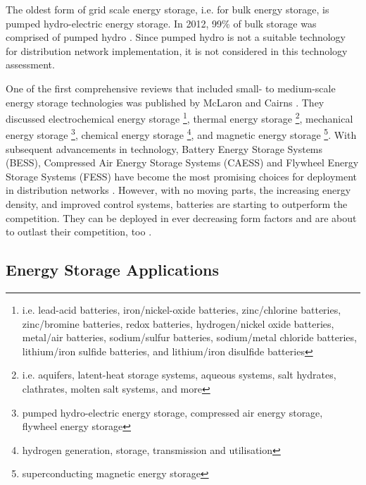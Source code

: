 The oldest form of grid scale energy storage, i.e. for bulk energy storage, is pumped hydro-electric energy storage.
In 2012, 99\% of bulk storage was comprised of pumped hydro \cite{TheEconomist2012a}.
Since pumped hydro is not a suitable technology for distribution network implementation, it is not considered in this technology assessment.

One of the first comprehensive reviews that included small- to medium-scale energy storage technologies was published by McLaron and Cairns \cite{McLarnon1989}.
They discussed
electrochemical energy storage \footnote[1]{i.e. lead-acid batteries, iron/nickel-oxide batteries, zinc/chlorine batteries, zinc/bromine batteries, redox batteries, hydrogen/nickel oxide batteries, metal/air batteries, sodium/sulfur batteries, sodium/metal chloride batteries, lithium/iron sulfide batteries, and lithium/iron disulfide batteries},
thermal energy storage \footnote[2]{i.e. aquifers, latent-heat storage systems, aqueous systems, salt hydrates, clathrates, molten salt systems, and more},
mechanical energy storage \footnote[3]{pumped hydro-electric energy storage, compressed air energy storage, flywheel energy storage},
chemical energy storage \footnote[4]{hydrogen generation, storage, transmission and utilisation},
and magnetic energy storage \footnote[5]{superconducting magnetic energy storage}.
With subsequent advancements in technology, Battery Energy Storage Systems (BESS), Compressed Air Energy Storage Systems (CAESS) and Flywheel Energy Storage Systems (FESS) have become the most promising choices for deployment in distribution networks \cite{Ibrahim2008, Chen2009, Hadjipaschalis2009}.
However, with no moving parts, the increasing energy density, and improved control systems, batteries are starting to outperform the competition.
They can be deployed in ever decreasing form factors and are about to outlast their competition, too \cite{Luo2015}.

\subsection{Energy Storage Applications}

